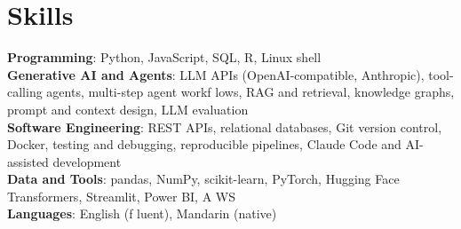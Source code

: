 \documentclass[letterpaper,11pt]{article}
\begin{document}
\section{\textbf{Skills}}
 \begin{itemize}[leftmargin=0.15in, label={}]
    \small{\item{
     \textbf{Programming}{: Python, JavaScript, SQL, R, Linux shell} \\
     \textbf{Generative AI and Agents}{: LLM APIs (OpenAI-compatible, Anthropic), tool-calling agents, multi-step agent workf\kern0pt lows, RAG and retrieval, knowledge graphs, prompt and context design, LLM evaluation} \\
     \textbf{Software Engineering}{: REST APIs, relational databases, Git version control, Docker, testing and debugging, reproducible pipelines, Claude Code and AI-assisted development} \\
     \textbf{Data and Tools}{: pandas, NumPy, scikit-learn, PyTorch, Hugging Face Transformers, Streamlit, Power BI, A\kern0pt WS} \\
     \textbf{Languages}{: English (f\kern0pt luent), Mandarin (native)}}}

 \end{itemize}
\end{document}
